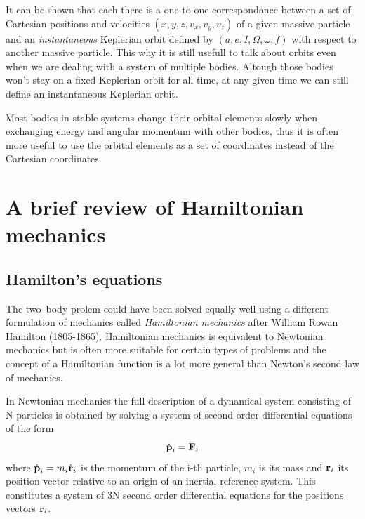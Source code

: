 It can be shown that each there is a one-to-one correspondance between 
a set of Cartesian positions and velocities $(x,y,z,v_x,v_y,v_z)$ 
of a given massive particle and an \emph{instantaneous} Keplerian orbit 
defined by $(a,e,I,\Omega,\omega,f)$ with respect to another massive
particle. This why it is still usefull to talk about orbits even
when we are dealing with a system of multiple bodies. Altough those
bodies won't stay on a fixed Keplerian orbit for all time, at any given
time we can still define an instantaneous Keplerian orbit.

Most bodies in stable systems change their orbital elements slowly
when exchanging energy and angular momentum with other bodies, thus
it is often more useful to use the orbital elements as a set of coordinates
instead of the Cartesian coordinates.

\section{A brief review of Hamiltonian mechanics}
\label{sec:hamiltonian_mechanics}
\subsection{Hamilton's equations}
\label{sub:Hamilton's equations}
The two--body prolem could have been solved equally well using a different
formulation of mechanics called \emph{Hamiltonian mechanics} after
William Rowan Hamilton (1805-1865). Hamiltonian
mechanics is equivalent to Newtonian mechanics but is often more suitable
for certain types of problems and the concept of a Hamiltonian function
is a lot more general than Newton's second law of mechanics.

In Newtonian mechanics the full description of a dynamical system 
consisting of N particles is 
obtained by solving a system of second order differential equations
of the form
\begin{equation}
    \dot{\boldsymbol{\mathbf{p}}}_i=\boldsymbol{\mathbf{F}}_i
\end{equation}
where $\dot{\boldsymbol{\mathbf{p}}}_i=m_i\dot{\boldsymbol{\mathbf{r}}}_i$ is the momentum of the
i-th particle, $m_i$ is its mass and $\boldsymbol{\mathbf{r}}_i$ its position vector
relative to an origin of an inertial reference system. This 
constitutes a system of 3N second order differential equations for
the positions vectors $\boldsymbol{\mathbf{r}}_i$.

